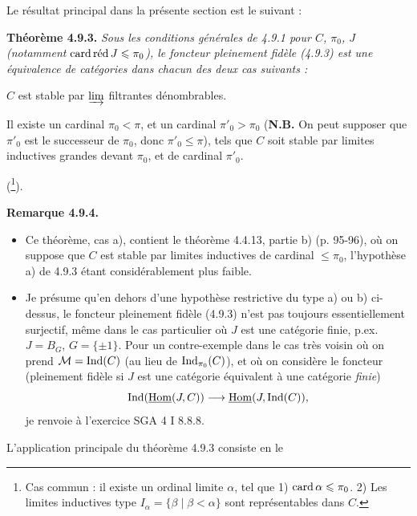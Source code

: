 \dgrchunkbegin

\sbox{\dctauAB}{\circled{$\scriptstyle\tau_{\alpha,\beta}$}}

Le résultat principal dans la présente section est le suivant :

\textbf{Théorème 4.9.3.} \textit{Sous les conditions générales de 4.9.1 pour $C$, $\pi_0$, $J$ (notamment} $\cardred J \leqslant \pi_0$\textit{), le foncteur pleinement fidèle (4.9.3) est une équivalence de catégories dans chacun des deux cas suivants :}
\begin{itemize}[label={}]
{\itshape
\item[a)] $C$ est stable par $\varinjlim$ filtrantes dénombrables.
\item[b)] Il existe un cardinal $\pi_0 < \pi$, et un cardinal $\pi'_0 > \pi_0$ \textup{(}\textbf{\upshape N.B.} On peut supposer que $\pi'_0$ est le successeur de $\pi_0$, donc $\pi'_0 \leqslant \pi$), tels que $C$ soit stable par limites inductives grandes devant $\pi_0$, et de cardinal $\pi'_0$.
}
\end{itemize}
(\footnote[94]{Cas commun : il existe un ordinal limite $\alpha$, tel que 1) $\card \alpha \leqslant \pi_0$. 2) Les limites inductives type $I_\alpha = \{\beta \mid \beta < \alpha\}$ sont représentables dans $C$.}).

\textbf{Remarque 4.9.4.}
\begin{itemize}[label={}]
\item[a)] Ce théorème, cas a), contient le théorème 4.4.13, partie b) (p. 95-96), où on suppose que $C$ est stable par limites inductives de cardinal $\leqslant \pi_0$, l'hypothèse a) de 4.9.3 étant considérablement plus faible.
\item[b)] Je présume qu'en dehors d'une hypothèse restrictive du type a) ou b) ci-dessus, le foncteur pleinement fidèle (4.9.3) n'est pas toujours essentiellement surjectif, même dans le cas particulier où $J$ est une catégorie finie, p.ex. $J = B_G$, $G = \{\pm 1\}$. Pour un contre-exemple dans le cas très voisin où on prend $\cM = \Ind(C)$ (au lieu de $\Ind_{\pi_0}(C)$), et où on considère le foncteur (pleinement fidèle si $J$ est une catégorie équivalent à une catégorie \textit{finie}) %
\[
\Ind(\uHom(J,C)) \longrightarrow \uHom(J,\Ind(C)),
\]
je renvoie à l'exercice SGA 4 I 8.8.8.
\end{itemize}
L'application principale du théorème 4.9.3 consiste en le

